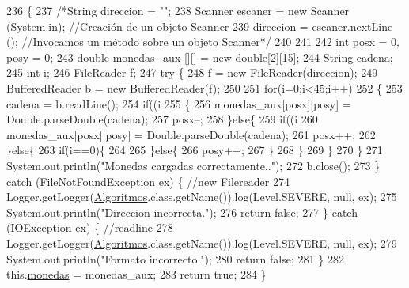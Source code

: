 \begin{DoxyCode}
236     \{
237         \textcolor{comment}{/*String direccion = "";}
238 \textcolor{comment}{        Scanner escaner = new Scanner (System.in); //Creación de un objeto Scanner}
239 \textcolor{comment}{        direccion = escaner.nextLine (); //Invocamos un método sobre un objeto Scanner*/}
240         
241         
242         \textcolor{keywordtype}{int} posx = 0, posy = 0;
243         \textcolor{keywordtype}{double} monedas\_aux [][] = \textcolor{keyword}{new} \textcolor{keywordtype}{double}[2][15];
244         String cadena;
245         \textcolor{keywordtype}{int} i;
246         FileReader f;
247         \textcolor{keywordflow}{try} \{
248             f = \textcolor{keyword}{new} FileReader(direccion);
249             BufferedReader b = \textcolor{keyword}{new} BufferedReader(f);
250             
251             \textcolor{keywordflow}{for}(i=0;i<45;i++)
252             \{
253                 cadena = b.readLine();
254                 \textcolor{keywordflow}{if}((i%
255                 \{
256                     monedas\_aux[posx][posy] = Double.parseDouble(cadena);
257                     posx--;
258                 \}\textcolor{keywordflow}{else}\{
259                     \textcolor{keywordflow}{if}((i%
260                         monedas\_aux[posx][posy] = Double.parseDouble(cadena);
261                         posx++;
262                     \}\textcolor{keywordflow}{else}\{
263                         \textcolor{keywordflow}{if}(i==0)\{
264                             
265                         \}\textcolor{keywordflow}{else}\{
266                             posy++;
267                         \}
268                     \}
269                 \}
270             \}
271             System.out.println(\textcolor{stringliteral}{"Monedas cargadas correctamente.."});
272             b.close();
273         \} \textcolor{keywordflow}{catch} (FileNotFoundException ex) \{ \textcolor{comment}{//new Filereader}
274             Logger.getLogger(\mbox{\hyperlink{classalgoritmia_1_1_algoritmos_a1ecfcbbdfa9fe28357385a28d24677e9}{Algoritmos}}.class.getName()).log(Level.SEVERE, null, ex);
275             System.out.println(\textcolor{stringliteral}{"Direccion incorrecta."});
276             \textcolor{keywordflow}{return} \textcolor{keyword}{false};
277         \} \textcolor{keywordflow}{catch} (IOException ex) \{ \textcolor{comment}{//readline}
278             Logger.getLogger(\mbox{\hyperlink{classalgoritmia_1_1_algoritmos_a1ecfcbbdfa9fe28357385a28d24677e9}{Algoritmos}}.class.getName()).log(Level.SEVERE, null, ex);
279             System.out.println(\textcolor{stringliteral}{"Formato incorrecto."});
280             \textcolor{keywordflow}{return} \textcolor{keyword}{false};
281         \}
282         this.\mbox{\hyperlink{classalgoritmia_1_1_algoritmos_a3f6bbaa8358a204e6dc486d7e818146f}{monedas}} = monedas\_aux;
283         \textcolor{keywordflow}{return} \textcolor{keyword}{true};
284     \}
\end{DoxyCode}
\mbox{\label{classalgoritmia_1_1_algoritmos_a673473cfeaecd827c7345fb929e19464}} 
